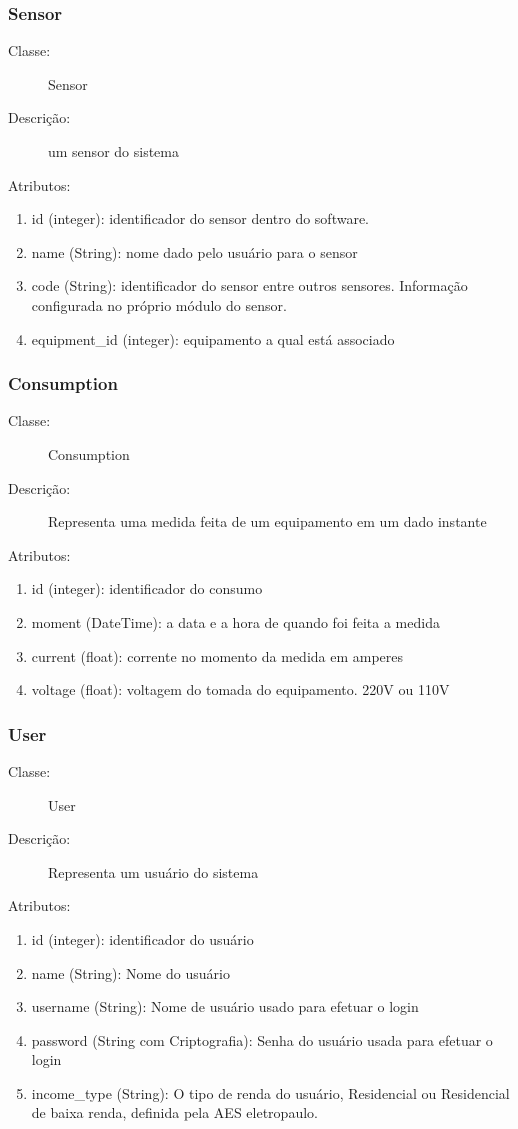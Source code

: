 \subsubsection{Sensor}
\begin{description}
	\item[Classe:] Sensor
	\item[Descrição:] um sensor do sistema
	\item[Atributos:]
\end{description} 
\begin{enumerate}
	\item id (integer): identificador do sensor dentro do software.
	\item name (String): nome dado pelo usuário para o sensor
	\item code (String): identificador do sensor entre outros sensores. Informação configurada no próprio módulo do sensor.
	\item equipment\_id (integer): equipamento a qual está associado
\end{enumerate}
%
\subsubsection{Consumption}
\begin{description}
	\item[Classe:] Consumption
	\item[Descrição:] Representa uma medida feita de um equipamento em um dado instante
	\item[Atributos:]
\end{description} 
\begin{enumerate}
	\item id (integer): identificador do consumo
	\item moment (DateTime): a data e a hora de quando foi feita a medida
	\item current (float): corrente no momento da medida em amperes
	\item voltage (float): voltagem do tomada do equipamento. 220V ou 110V
\end{enumerate}
%
\subsubsection{User}
\begin{description}
	\item[Classe:] User
	\item[Descrição:] Representa um usuário do sistema
	\item[Atributos:]
\end{description} 
\begin{enumerate}
	\item id (integer): identificador do usuário
	\item name (String):  Nome do usuário
	\item username (String): Nome de usuário usado para efetuar o login
	\item password (String com Criptografia): Senha do usuário usada para efetuar o login
    \item income\_type (String): O tipo de renda do usuário, Residencial ou Residencial de baixa renda, definida pela AES eletropaulo.
\end{enumerate}
%
